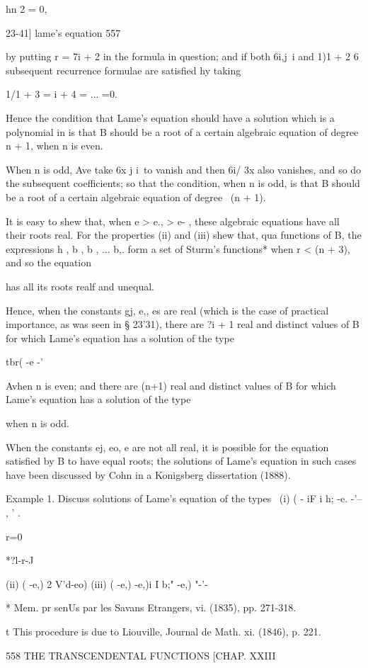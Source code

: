 {{{{hn 2 = 0,

23-41] lame's equation 557

by putting r = 7i + 2 in the formula in question; and if both 6i,j\ i
and 1)1 + 2 6 subsequent recurrence formulae are satisfied hy taking

 1/1 + 3 = i + 4 = ... =0.

Hence the condition that Lame's equation should have a solution which
is a polynomial in is that B should be a root of a certain algebraic
equation of degree n + 1, when n is even.

When n is odd, Ave take 6x j i\ to vanish and then 6i/ 3x also
vanishes, and so do the subsequent coefficients; so that the
condition, when n is odd, is that B should be a root of a certain
algebraic equation of degree \ (n + 1).

It is easy to shew that, when e > e., > e- , these algebraic equations
have all their roots real. For the properties (ii) and (iii) shew
that, qua functions of B, the expressions h , b , b , ... b,. form a
set of Sturm's functions* when r < (n + 3), and so the equation

has all its roots realf and unequal.

Hence, when the constants gj, e,, es are real (which is the case of
practical importance, as was seen in § 23'31), there are ?i + 1 real
and distinct values of B for which Lame's equation has a solution of
the type

tbr( -e -'

Avhen n is even; and there are (n+1) real and distinct values of B for
which Lame's equation has a solution of the type

when n is odd.

When the constants ej, eo, e are not all real, it is possible for the
equation satisfied by B to have equal roots; the solutions of Lame's
equation in such cases have been discussed by Cohn in a Konigsberg
dissertation (1888).

Example 1. Discuss solutions of Lame's equation of the types \ (i) ( -
iF i h; -e. -'-- , ' .

r=0

*?l-r-J

(ii) ( -e,) 2 V'd-eo) (iii) ( -e,) -e,)i I b;" -e,) "-'-\

* Mem. pr senUs par les Savans Etrangers, vi. (1835), pp. 271-318.

t This procedure is due to Liouville, Journal de Math. xi. (1846), p.
221.

558 THE TRANSCENDENTAL FUNCTIONS [CHAP. XXIII

}}}}
